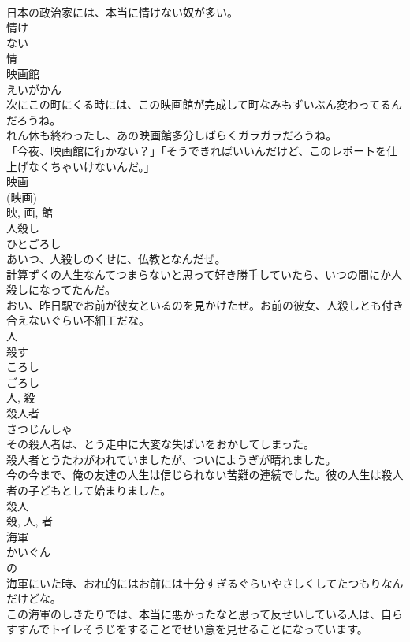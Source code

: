 \documentclass[8pt]{extreport}
\begin{document}
\begin{CJK}{UTF8}{min}
\\	日本の政治家には、本当に情けない奴が多い。	
\\	情け 
\\	ない 
\\	情	
\\	映画館	
\\	えいがかん	
\\	次にこの町にくる時には、この映画館が完成して町なみもずいぶん変わってるんだろうね。	
\\	れん休も終わったし、あの映画館多分しばらくガラガラだろうね。	
\\	「今夜、映画館に行かない？」「そうできればいいんだけど、このレポートを仕上げなくちゃいけないんだ。」	
\\	映画 
\\	(映画) 
\\	映, 画, 館	
\\	人殺し	
\\	ひとごろし	
\\	あいつ、人殺しのくせに、仏教となんだぜ。	
\\	計算ずくの人生なんてつまらないと思って好き勝手していたら、いつの間にか人殺しになってたんだ。	
\\	おい、昨日駅でお前が彼女といるのを見かけたぜ。お前の彼女、人殺しとも付き合えないぐらい不細工だな。	
\\	人
\\	殺す
\\	ころし 
\\	ごろし 
\\	人, 殺	
\\	殺人者	
\\	さつじんしゃ	
\\	その殺人者は、とう走中に大変な失ぱいをおかしてしまった。	
\\	殺人者とうたわがわれていましたが、ついにようぎが晴れました。	
\\	今の今まで、俺の友達の人生は信じられない苦難の連続でした。彼の人生は殺人者の子どもとして始まりました。	
\\	殺人 
\\	殺, 人, 者	
\\	海軍	
\\	かいぐん	
\\	の 
\\	海軍にいた時、おれ的にはお前には十分すぎるぐらいやさしくしてたつもりなんだけどな。	
\\	この海軍のしきたりでは、本当に悪かったなと思って反せいしている人は、自らすすんでトイレそうじをすることでせい意を見せることになっています。	

\end{CJK}
\end{document}

